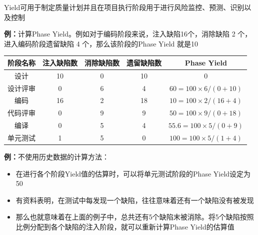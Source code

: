 Yield可用于制定质量计划并且在项目执行阶段用于进行风险监控、预测、识别以及控制

\textbf{例：}计算Phase Yield。例如对于编码阶段来说，注入缺陷16个，消除缺陷 2 个，进入编码阶段遗留缺陷 4 个，那么该阶段的Phase Yield 就是10
\vspace{-0.5em}
\begin{table}[H]
    \centering
    \begin{tabular}{|c|c|c|c|c|}
    \hline
    \textbf{阶段名称} & \textbf{注入缺陷数} & \textbf{消除缺陷数} & \textbf{遗留缺陷数} & \textbf{Phase Yield}    \\ \hline
    设计            & 10             & 0              & 10             & 0                       \\ \hline
    设计评审          & 0              & 6              & 4              & $60=100 \times 6/ (0 + 10)$    \\ \hline
    编码            & 16             & 2              & 18             & $10=100 \times 2/(16 + 4)$     \\ \hline
    代码评审          & 0              & 9              & 9              & $50 = 100 \times 9 / (0 + 18)$ \\ \hline
    编译            & 0              & 5              & 4              & $55.6=100\times 5/(0+9)$       \\ \hline
    单元测试          & 1              & 5              & 0              & $100=100 \times 5 / (1 + 4)$   \\ \hline
    \end{tabular}
\end{table}
\vspace{-1em}

\textbf{例：}不使用历史数据的计算方法：
\begin{itemize}
    \item 在进行各个阶段Yield值的估算时，可以将单元测试阶段的Phase Yield设定为50
    \item 有资料表明，在测试中每发现一个缺陷，往往意味着还有一个缺陷没有被发现
    \item 那么也就意味着在上面的例子中，总共还有5个缺陷末被消除。将5个缺陷按照比例分配到各个缺陷的注入阶段，就可以重新计算Phase Yield的估算值
\end{itemize}

